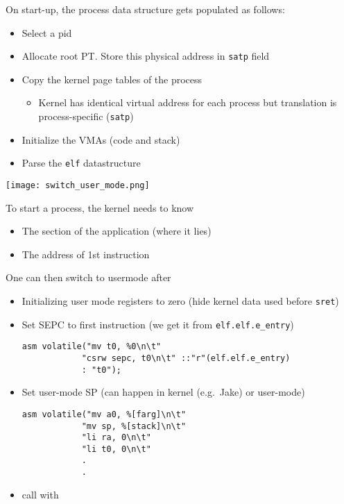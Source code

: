 On start-up, the process data structure gets populated as follows:
\begin{itemize}
    \item Select a pid
    \item Allocate root PT. Store this physical address in \texttt{satp} field
    \item Copy the kernel page tables of the process
    \begin{itemize}
        \item Kernel has identical virtual address for each process but translation is process-specific (\texttt{satp})
    \end{itemize}
    \item Initialize the VMAs (code and stack)
    \item Parse the \texttt{elf} datastructure
\end{itemize}

\newpar{}
\begin{center}
    \texttt{[image: switch\_user\_mode.png]}
\end{center}
To start a process, the kernel needs to know
\begin{itemize}
    \item The  section of the application (where it lies)
    \item The address of 1st instruction
\end{itemize}
One can then switch to usermode after
\begin{itemize}
    \item Initializing user mode registers to zero (hide kernel data used before \texttt{sret})
    \item Set SEPC to first instruction (we get it from \texttt{elf.elf.e\_entry})
    \begin{lstlisting}[style=bright_C++]
    asm volatile("mv t0, %0\n\t"
            "csrw sepc, t0\n\t" ::"r"(elf.elf.e_entry)
            : "t0");
    \end{lstlisting}
    \item Set user-mode SP (can happen in kernel (e.g.\ Jake) or user-mode)
    \begin{lstlisting}[style=bright_C++]
    asm volatile("mv a0, %[farg]\n\t"
            "mv sp, %[stack]\n\t"
            "li ra, 0\n\t"
            "li t0, 0\n\t"
            .
            .
    \end{lstlisting}
    \item call  with 
\end{itemize}

